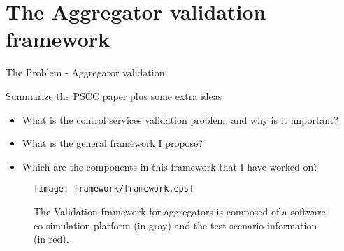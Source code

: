 \chapter{The Aggregator validation framework}
\label{cha:validation}
The Problem -  Aggregator validation

Summarize the PSCC paper plus some extra ideas

\begin{itemize}
	\item What is the control services validation problem, and why is it important?
	\item What is the general framework I propose?
	\item Which are the components in this framework that I have worked on?
\end{itemize}
\begin{figure}[ht]
	\centering
	\caption{The Validation framework for aggregators is composed of a software co-simulation platform (in gray) and the test scenario information (in red). }
	\texttt{[image: framework/framework.eps]}\label{fig:frameworkbig}
\end{figure}

